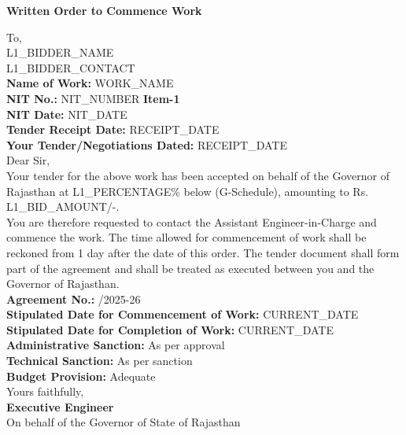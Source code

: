 \documentclass[a4paper]{article}
\begin{document}
\begin{center}
    \textbf{\Large Written Order to Commence Work}
\end{center}

To, \\
{L1_BIDDER_NAME} \\
{L1_BIDDER_CONTACT} \\

\vspace{0.5cm}
\textbf{Name of Work:} {WORK_NAME} \\
\textbf{NIT No.:} {NIT_NUMBER} \quad \textbf{Item-1} \\
\textbf{NIT Date:} {NIT_DATE} \\
\textbf{Tender Receipt Date:} {RECEIPT_DATE} \\
\textbf{Your Tender/Negotiations Dated:} {RECEIPT_DATE} \\

Dear Sir, \\

Your tender for the above work has been accepted on behalf of the Governor of Rajasthan at {L1_PERCENTAGE}\% below (G-Schedule), amounting to Rs. {L1_BID_AMOUNT}/-. \\

You are therefore requested to contact the Assistant Engineer-in-Charge and commence the work. The time allowed for commencement of work shall be reckoned from 1 day after the date of this order. The tender document shall form part of the agreement and shall be treated as executed between you and the Governor of Rajasthan. \\

\textbf{Agreement No.:} /2025-26 \\
\textbf{Stipulated Date for Commencement of Work:} {CURRENT_DATE} \\
\textbf{Stipulated Date for Completion of Work:} {CURRENT_DATE} \\
\textbf{Administrative Sanction:} As per approval \\
\textbf{Technical Sanction:} As per sanction \\
\textbf{Budget Provision:} Adequate \\

Yours faithfully, \\
\vspace{0.5cm}
\textbf{Executive Engineer} \\
On behalf of the Governor of State of Rajasthan \\
\end{document}
